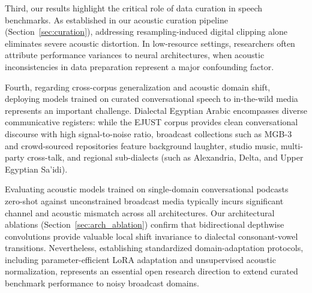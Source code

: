 \documentclass[journal]{IEEEtran}
\begin{document}
Third, our results highlight the critical role of data curation in speech benchmarks. As established in our acoustic curation pipeline (Section~\ref{sec:curation}), addressing resampling-induced digital clipping alone eliminates severe acoustic distortion. In low-resource settings, researchers often attribute performance variances to neural architectures, when acoustic inconsistencies in data preparation represent a major confounding factor.

Fourth, regarding cross-corpus generalization and acoustic domain shift, deploying models trained on curated conversational speech to in-the-wild media represents an important challenge. Dialectal Egyptian Arabic encompasses diverse communicative registers: while the EJUST corpus provides clean conversational discourse with high signal-to-noise ratio, broadcast collections such as MGB-3~\cite{ali2017mgb3} and crowd-sourced repositories feature background laughter, studio music, multi-party cross-talk, and regional sub-dialects (such as Alexandria, Delta, and Upper Egyptian Sa'idi). 

Evaluating acoustic models trained on single-domain conversational podcasts zero-shot against unconstrained broadcast media typically incurs significant channel and acoustic mismatch across all architectures. Our architectural ablations (Section~\ref{sec:arch_ablation}) confirm that bidirectional depthwise convolutions provide valuable local shift invariance to dialectal consonant-vowel transitions. Nevertheless, establishing standardized domain-adaptation protocols, including parameter-efficient LoRA adaptation and unsupervised acoustic normalization, represents an essential open research direction to extend curated benchmark performance to noisy broadcast domains.
\end{document}
